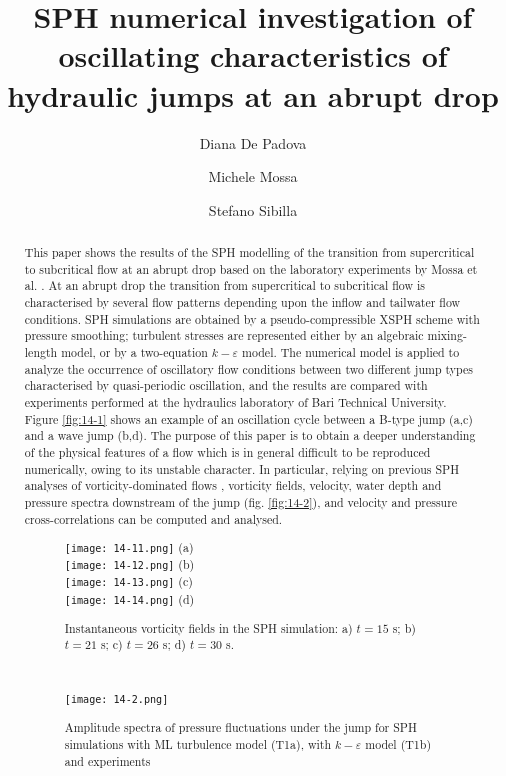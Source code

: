 \documentclass[10pt]{article}
\title{SPH numerical investigation of oscillating characteristics of hydraulic jumps at an abrupt drop}
\date{}
\author[1]{Diana De Padova}
\author[1]{Michele Mossa}
\author[2]{Stefano Sibilla}
\affil[1]{Department of Civil, Environmental, Building Engineering and Chemistry, Technical University of Bari, Italy}
\affil[2]{Department of Civil Engineering and Architecture, University of Pavia, Italy}
\begin{document}
\maketitle


\begin{abstract}
This paper shows the results of the SPH modelling of the transition from supercritical to subcritical flow at an abrupt drop based on the laboratory experiments by Mossa et al. \cite{mossa2003tailwater}. At an abrupt drop the transition from supercritical to subcritical flow is characterised by several flow patterns depending upon the inflow and tailwater flow conditions. SPH simulations are obtained by a pseudo-compressible XSPH scheme with pressure smoothing; turbulent stresses are represented either by an algebraic mixing- length model, or by a two-equation $k-\varepsilon$ model. The numerical model is applied to analyze the occurrence of oscillatory flow conditions between two different jump types characterised by quasi-periodic oscillation, and the results are compared with experiments performed at the hydraulics laboratory of Bari Technical University. Figure \ref{fig:14-1} shows an example of an oscillation cycle between a B-type jump (a,c) and a wave jump (b,d). The purpose of this paper is to obtain a deeper understanding of the physical features of a flow which is in general difficult to be reproduced numerically, owing to its unstable character. In particular, relying on previous SPH analyses of vorticity-dominated flows \cite{de2016sph}, vorticity fields, velocity, water depth and pressure spectra downstream of the jump (fig. \ref{fig:14-2}), and velocity and pressure cross-correlations can be computed and analysed.

\begin{figure}[!htb]
\begin{minipage}[b]{0.42\linewidth}
\centering
\texttt{[image: 14-11.png]} (a)\\
\texttt{[image: 14-12.png]} (b)\\
\texttt{[image: 14-13.png]} (c)\\
\texttt{[image: 14-14.png]} (d)
\caption{Instantaneous vorticity fields in the SPH simulation: a) $t=15$ s; b) $t=21$ s; c) $t=26$ s; d) $t=30$ s.}\label{fig:14-1}
\end{minipage}
\begin{minipage}[b]{0.05\linewidth}
~
\end{minipage}
\begin{minipage}[b]{0.5\linewidth}
\centering
\texttt{[image: 14-2.png]}
\caption{Amplitude spectra of pressure fluctuations under the jump for SPH simulations with ML turbulence model (T1a), with $k-\varepsilon$ model (T1b) and experiments}\label{fig:14-2}
\end{minipage}
\end{figure}

\end{abstract}


\addbib
\end{document}
